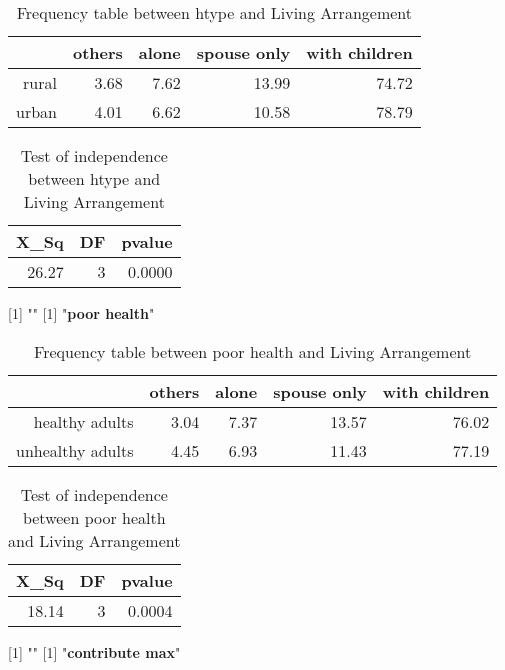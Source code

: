 \documentclass[11pt]{article}
\begin{document}
\begin{table}[H]
\centering
\begin{tabular}{rrrrr}
  \hline
 & others & alone & spouse only & with children \\ 
  \hline
rural & 3.68 & 7.62 & 13.99 & 74.72 \\ 
  urban & 4.01 & 6.62 & 10.58 & 78.79 \\ 
   \hline
\end{tabular}
\caption{Frequency table between htype and Living Arrangement} 
\end{table}
\begin{table}[H]
\centering
\begin{tabular}{rrr}
  \hline
X\_Sq & DF & pvalue \\ 
  \hline
26.27 & 3 & 0.0000 \\ 
   \hline
\end{tabular}
\caption{Test of independence between htype and Living Arrangement} 
\end{table}
[1] "\newline"
[1] "{\bf{poor health}}"
\begin{table}[H]
\centering
\begin{tabular}{rrrrr}
  \hline
 & others & alone & spouse only & with children \\ 
  \hline
healthy adults & 3.04 & 7.37 & 13.57 & 76.02 \\ 
  unhealthy adults & 4.45 & 6.93 & 11.43 & 77.19 \\ 
   \hline
\end{tabular}
\caption{Frequency table between poor health and Living Arrangement} 
\end{table}
\begin{table}[H]
\centering
\begin{tabular}{rrr}
  \hline
X\_Sq & DF & pvalue \\ 
  \hline
18.14 & 3 & 0.0004 \\ 
   \hline
\end{tabular}
\caption{Test of independence between poor health and Living Arrangement} 
\end{table}
[1] "\newline"
[1] "{\bf{contribute max}}"
\end{document}
